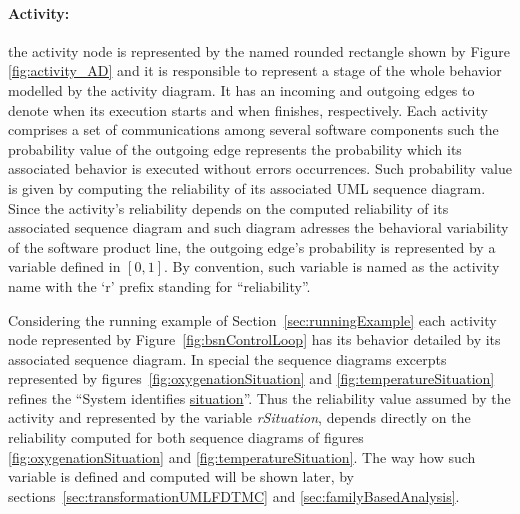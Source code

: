 \paragraph{Activity: \label{par:activityModeling}}
the activity node is represented by the named rounded rectangle shown by Figure
\ref{fig:activity_AD} and it is responsible to represent a stage of the whole
behavior modelled by the activity diagram. It has an incoming and outgoing
edges to denote when its execution starts and when finishes, respectively. Each
activity comprises a set of communications among several software components
such the probability value of the outgoing edge represents the probability
which its associated behavior is executed without errors occurrences. Such
probability value is given by computing the reliability of its associated UML
sequence diagram. Since the activity's reliability depends on the computed
reliability of its associated sequence diagram and such diagram adresses the
behavioral variability of the software product line, the outgoing edge's
probability is represented by a variable defined in $[0,1]$.
By convention, such variable is named as the activity name with the `r' prefix
standing for ``reliability''.  

Considering the running example of Section~\ref{sec:runningExample} each
activity node represented by Figure~\ref{fig:bsnControlLoop} has its behavior
detailed by its associated
sequence diagram. In special the sequence diagrams excerpts represented by
figures~\ref{fig:oxygenationSituation} and \ref{fig:temperatureSituation} refines the ``System identifies
\underline{situation}''. Thus the reliability value assumed by the
activity and represented by the variable \emph{rSituation}, depends directly on the
reliability computed for both sequence diagrams of figures \ref{fig:oxygenationSituation} and \ref{fig:temperatureSituation}. The
way how such variable is defined and computed will be shown later, by
sections~\ref{sec:transformationUMLFDTMC} and \ref{sec:familyBasedAnalysis}.

